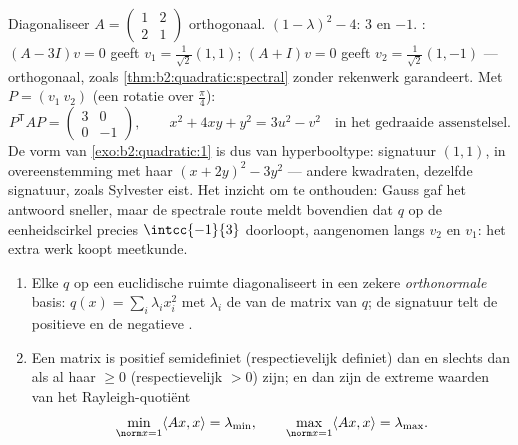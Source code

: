 \begin{example}\label{ex:b2:quadratic:fullrun}
Diagonaliseer $A = \begin{pmatrix} 1 & 2\\ 2 & 1\end{pmatrix}$
orthogonaal.  $(1 - \lambda)^2 - 4$:
 $3$ en $-1$. : $(A - 3I)v = 0$ geeft $v_1
= \frac{1}{\sqrt2}(1,1)$; $(A + I)v = 0$ geeft $v_2 =
\frac{1}{\sqrt2}(1,-1)$ --- orthogonaal, zoals
\cref{thm:b2:quadratic:spectral} zonder rekenwerk garandeert. Met
$P = (v_1\ v_2)$ (een rotatie over $\frac\pi4$):
\[
P^{\mathsf T}AP = \begin{pmatrix} 3 & 0\\ 0 & -1
\end{pmatrix},
\qquad
x^2 + 4xy + y^2 = 3u^2 - v^2
\quad\text{in het gedraaide assenstelsel} .
\]
De vorm van \cref{exo:b2:quadratic:1} is dus van hyperbooltype:
signatuur $(1,1)$, in overeenstemming met haar  $(x +
2y)^2 - 3y^2$ --- andere kwadraten, dezelfde signatuur, zoals
Sylvester eist. Het inzicht om te onthouden: Gauss gaf het antwoord
sneller, maar de spectrale route meldt bovendien dat $q$ op de
eenheidscirkel precies $\intcc{-1}{3}$ doorloopt, aangenomen langs
$v_2$ en $v_1$: het extra werk koopt meetkunde.
\end{example}

\begin{corollary}\label{cor:b2:quadratic:principalaxes}
\begin{enumerate}
  \item Elke  $q$ op een euclidische ruimte
        diagonaliseert in een zekere \emph{orthonormale} basis:
        $q(x) = \sum_i \lambda_i x_i^2$ met $\lambda_i$ de
         van de  matrix van $q$; de
        signatuur telt de positieve en de negatieve .
  \item Een  matrix is positief semidefiniet
        (respectievelijk definiet) dan en slechts dan als al haar
         $\geq 0$ (respectievelijk $> 0$) zijn; en dan
        zijn de extreme waarden van het Rayleigh-quotiënt
        \[
        \min_{\norm x = 1} \langle Ax, x\rangle = \lambda_{\min},
        \qquad
        \max_{\norm x = 1} \langle Ax, x\rangle = \lambda_{\max} .
        \]
\end{enumerate}
\end{corollary}

